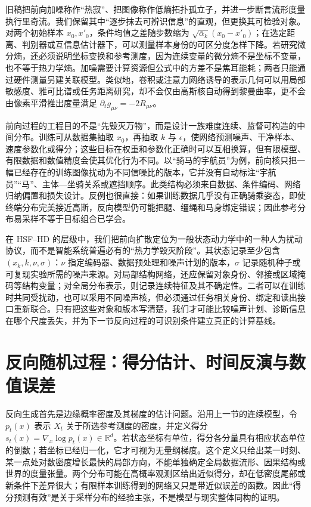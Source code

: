 旧稿把前向加噪称作“热寂”、把图像称作低熵拓扑孤立子，并进一步断言流形度量执行里奇流。我们保留其中“逐步抹去可辨识信息”的直观，但更换其可检验对象。对两个初始样本 $x_0,x'_0$，条件均值之差随步数缩为 $\sqrt{\bar\alpha_k}(x_0-x'_0)$；在选定距离、判别器或互信息估计器下，可以测量样本身份的可区分度怎样下降。若研究微分熵，还必须说明坐标变换和参考测度，因为连续变量的微分熵不是坐标不变量，也不等于热力学熵。加噪需要计算资源但公式中的方差不是焦耳能耗；两者只能通过硬件测量另建关联模型。类似地，卷积或注意力网络诱导的表示几何可以用局部敏感度、雅可比谱或任务距离研究，却不会仅由高斯核自动得到黎曼曲率，更不会由像素平滑推出度量满足 $\partial_tg_{\mu\nu}=-2R_{\mu\nu}$。

前向过程的工程目的不是“先毁灭万物”，而是设计一族难度连续、监督可构造的中间分布。训练可从数据集抽取 $x_0$，再抽取 $k$ 与 $\epsilon$，使网络预测噪声、干净样本、速度参数化或得分；这些目标在权重和参数化正确时可以互相换算，但有限模型、有限数据和数值精度会使其优化行为不同。以“骑马的宇航员”为例，前向核只把一幅已经存在的训练图像扰动为不同信噪比的版本，它并没有自动标注“宇航员”“马”、主体—坐骑关系或遮挡顺序。此类结构必须来自数据、条件编码、网络归纳偏置和损失设计。反例也很直接：如果训练数据几乎没有正确骑乘姿态，即使终端分布完美接近高斯，反向模型仍可能把腿、缰绳和马身绑定错误；因此参考分布易采样不等于目标组合已学会。

在 HSF--HD 的层级中，我们把前向扩散定位为一般状态动力学中的一种人为扰动协议，而不是智能系统普遍必有的“热力学毁灭阶段”。其状态记录至少包含 $(x_k,k,\nu,\sigma)$：$\nu$ 指定编码器、数据预处理和噪声计划的版本，$\sigma$ 记录随机种子或可复现实验所需的噪声来源。对局部结构网络，还应保留对象身份、邻接或区域掩码等结构变量；对全局分布表示，则记录连续特征及其不确定性。二者可以在训练时共同受扰动，也可以采用不同噪声核，但必须通过任务相关身份、绑定和读出接口重新联合。只有把这些对象和版本写清楚，我们才可能比较噪声计划、诊断信息在哪个尺度丢失，并为下一节反向过程的可识别条件建立真正的计算基线。

\section{反向随机过程：得分估计、时间反演与数值误差}
\label{sec:reverse_sde_cefe}

反向生成首先是边缘概率密度及其梯度的估计问题。沿用上一节的连续模型，令 $p_t(x)$ 表示 $X_t$ 关于所选参考测度的密度，并定义得分 $s_t(x)=\nabla_x\log p_t(x)\in\mathbb{R}^d$。若状态坐标有单位，得分各分量具有相应状态单位的倒数；若坐标已经归一化，它才可视为无量纲梯度。这个定义只给出某一时刻、某一点处对数密度增长最快的局部方向，不能单独确定全局数据流形、因果结构或世界的度量张量。两个分布可能在高概率观测区给出近似得分，却在低密度尾部或新条件下差异很大；有限样本训练得到的网络又只是带近似误差的函数。因此“得分预测有效”是关于采样分布的经验主张，不是模型与现实整体同构的证明。

